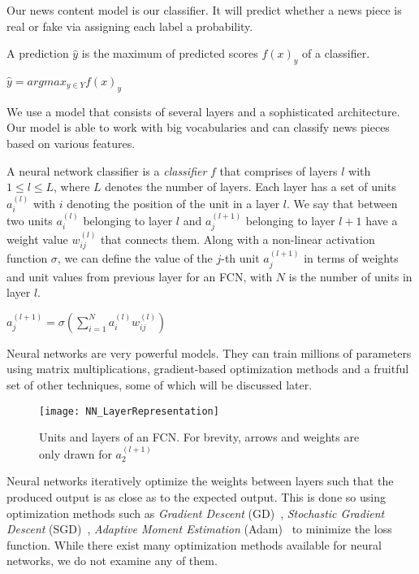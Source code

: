 Our news content model is our classifier. It will predict whether a news piece is real or fake via assigning each label a probability.
\begin{definition}
    A prediction $\hat{y}$ is the maximum of predicted scores $f(x)_y$ of a classifier.
    \begin{center}
        $\hat{y} = argmax_{y \in Y} f(x)_y$
    \end{center}
\end{definition}
We use a model that consists of several layers and a sophisticated architecture. Our model is able to work with big vocabularies and can classify news pieces based on various features.
\begin{definition}
    A neural network classifier is a \emph{classifier} $f$ that comprises of layers $l$ with $1 \leq l \leq L$, where $L$ denotes the number of layers. Each layer has a set of units $a_i^{(l)}$ with $i$ denoting the position of the unit in
    a layer $l$. We say that between two units $a_i^{(l)}$ belonging to layer $l$ and $a_j^{(l+1)}$ belonging to layer
    $l+1$ have a weight value $w_{ij}^{(l)}$ that connects them. Along with a non-linear activation function $\sigma$, we
    can define the value of the $j$-th unit $a_j^{(l+1)}$ in terms of weights and unit values from previous layer for an FCN, with $N$ is the number of units in layer $l$.
    \begin{center}
        $a_j^{(l+1)} = \sigma(\sum\limits_{i=1}^{N} a_i^{(l)} w_{ij}^{(l)})$
    \end{center}
\end{definition}
Neural networks are very powerful models. They can train millions of parameters using matrix multiplications, gradient-based optimization methods and a fruitful set of other techniques, some of which will be discussed later.
\begin{figure}
    \centering
    \texttt{[image: NN\_LayerRepresentation]}
    \caption[Units and layers of an FCN]{Units and layers of an FCN. For brevity, arrows and weights are only drawn for $a_2^{(l+1)}$}
    \label{fig:NN_LayerRepresentation}
\end{figure}
Neural networks iteratively optimize the weights between layers such that the produced output is as close as to the
expected output. This is done so using optimization methods such as \emph{Gradient Descent} (GD)~\parencite{GD_Cauchy},
\emph{Stochastic Gradient Descent} (SGD)~\parencite{SGD_Robbins}, \emph{Adaptive Moment Estimation} (Adam)~\parencite{Adam_Kingma} to minimize the loss function. While there exist many optimization methods available for neural networks, we do not examine any of them.\\
